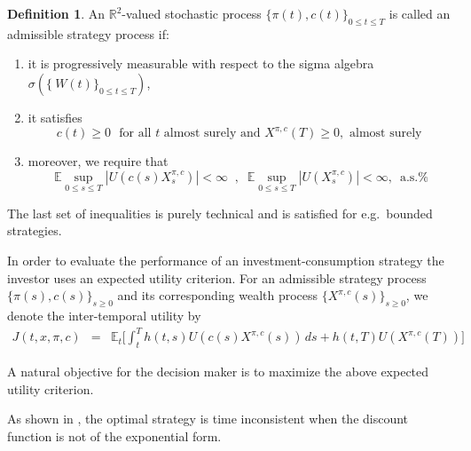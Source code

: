 \documentclass[11pt, psfig]{article}
\theoremstyle{definition}
\newtheorem{definition}[theorem]{Definition}
\theoremstyle{remark}
\numberwithin{equation}{section}
\begin{document}
\begin{definition}
 \label{def121_1} An $\mathbb{R}^{2}$-valued
stochastic process $\{\pi (t),c(t)\}_{0\leq t\leq T}$ is called an
admissible strategy process if:

\begin{enumerate}
\item it is progressively measurable with respect to the sigma algebra $%
\sigma (\{\ W(t)\}_{0\leq t\leq T})$,
\item it satisfies \begin{equation}\label{eq12_3}
c(t)\geq 0\,\, \text{ for all $t$ almost surely and } {X}^{\pi ,c}(T)\geq 0,\text{ almost surely }
\end{equation} 
%
\item moreover, we require that 
\begin{equation}  \label{eq121_4}
\mathbb{E} \sup_{0\leq s\leq T} |U(c(s)X^{\pi,c}_s)|<\infty \; \; , \; \;
 \mathbb{E}
\sup_{0\leq s\leq T} |U({X}^{\pi,c}_s)|<\infty, \, \text{ a.s.%
}
\end{equation}

\end{enumerate}
\end{definition}

The last set of inequalities is purely technical and is satisfied for e.g.\ bounded strategies.

In order to evaluate the performance of an investment-consumption
strategy the investor uses an expected utility criterion. For an
admissible strategy process $\{{\pi }(s),c(s)\}_{s\geq 0}$ and its
corresponding wealth process $\{X^{\pi ,c}(s)\}_{s\geq 0}$, we denote the
inter-temporal utility  by 
%
\begin{eqnarray}  \label{eq122_1}
J( t,x,\pi ,c)&=& \mathbb{E}_t\bigg[ \int_{t}^{T} h(t,s)
U(c(s)X^{\pi,c}(s))\,ds + h(t,T) {U}%
(X^{\pi,c}(T))\bigg]  \nonumber
\end{eqnarray}

A natural objective for the decision maker is to maximize the above expected
utility criterion.

As shown in \cite{Ek_Mb_Pi1}, the optimal strategy is time inconsistent when the discount function is not of the exponential form.
\end{document}
